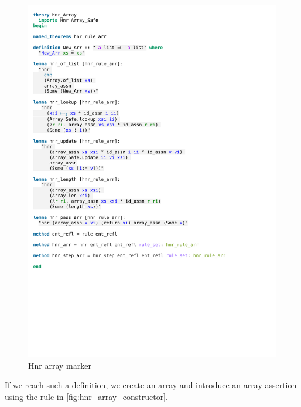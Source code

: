 \begin{figure}[htpb]
    \includegraphics[trim={0 25,4cm 0 3,4cm}, clip, width=1.00\textwidth]{figures/Theory_Hnr_Array.pdf}
    \caption[Hnr array marker]{Hnr array marker}
    \label{fig:hnr_array_marker}
\end{figure}

\noindent If we reach such a definition, we create an array and introduce an array assertion using the rule in \autoref{fig:hnr_array_constructor}.

